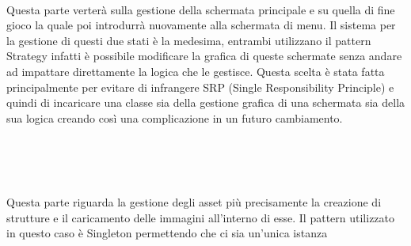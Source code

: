 \documentclass[a4paper,12pt]{report}
\begin{document}
    \\
    \par Questa parte verterà sulla gestione della schermata principale e su quella di fine gioco la quale poi introdurrà nuovamente
    alla schermata di menu. Il sistema per la gestione di questi due stati è la medesima, entrambi utilizzano il pattern Strategy
    infatti è possibile modificare la grafica di queste schermate senza andare ad impattare direttamente la logica che le gestisce.
    Questa scelta è stata fatta principalmente per evitare di infrangere SRP (Single Responsibility Principle) e quindi
    di incaricare una classe sia della gestione grafica di una schermata sia della sua logica creando così una complicazione
    in un futuro cambiamento.
    \\
    \\
    \par
    \\
    \\
    \par Questa parte riguarda la gestione degli asset più precisamente la creazione di strutture e il caricamento delle
    immagini all’interno di esse. Il pattern utilizzato in questo caso è Singleton permettendo che ci sia un'unica istanza
\end{document}
